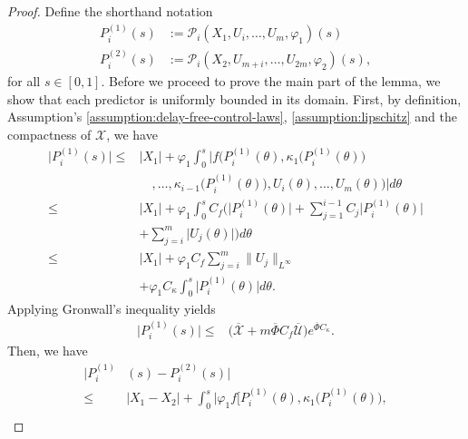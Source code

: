 \documentclass[10pt,a4paper]{amsart}
\begin{document}
\begin{proof}
Define the shorthand notation
\begin{align}
    P_i^{(1)}(s) &:= \mathcal{P}_i(X_1,U_i,\dots,U_m, \varphi_1)(s) \\
    P_i^{(2)}(s) &:= \mathcal{P}_i(X_2,U_{m+i},\dots,U_{2m}, \varphi_2)(s),
\end{align}
for all $s \in [0,1]$. Before we proceed to prove the main part of the lemma, we show that each predictor is uniformly bounded in its domain. First, by definition, Assumption's \ref{assumption:delay-free-control-laws}, \ref{assumption:lipschitz} and the compactness of $\mathcal{X}$, we have
\begin{align}
    \bigg| P_i^{(1)}(s) \bigg| \leq& |X_1| + \varphi_1 \int_{0}^s \bigg| f \bigg( P_i^{(1)}(\theta), \kappa_1 \bigg( P_i^{(1)}(\theta) \bigg)\nonumber \\ 
    &\quad , \dots, \kappa_{i-1} \bigg( P_i^{(1)}(\theta) \bigg), U_i(\theta), \dots, U_m(\theta) \bigg) \bigg| d\theta \nonumber \\
        \leq& |X_1| + \varphi_1 \int_{0}^s C_f \Biggl( \bigg| P_i^{(1)}(\theta) \bigg| + \sum_{j=1}^{i-1} C_j \bigg| P_i^{(1)}(\theta) \bigg| \nonumber \\ & + \sum_{j=i}^m \bigg| U_j(\theta) \bigg| \Biggr) d\theta \nonumber \\
        \leq& |X_1| + \varphi_1 C_f \sum_{j=i}^m \| U_j \|_{L^\infty} \nonumber \\ & + \varphi_1 C_{\kappa} \int_{0}^s \bigg| P_i^{(1)}(\theta) \bigg| d\theta.
\end{align}
Applying Gronwall's inequality yields
\begin{align}
    \bigg| P_i^{(1)}(s) \bigg| \leq& \bigg( \overline{\mathcal{X}} + m \overline{\Phi} C_f \overline{\mathcal{U}} \bigg) e^{\overline{\Phi} C_{\kappa}}.
\end{align}
Then, we have
\begin{align}
    \bigg| P_i^{(1)}&(s) - P_i^{(2)}(s) \bigg| \nonumber \\ 
        \leq& |X_1 - X_2|  + \int_{0}^s \bigg| \varphi_1 f \bigg[ P_i^{(1)}(\theta), \kappa_1 \bigg( P_i^{(1)}(\theta) \bigg),\nonumber \\ 

\end{align}
\end{proof}
\end{document}
